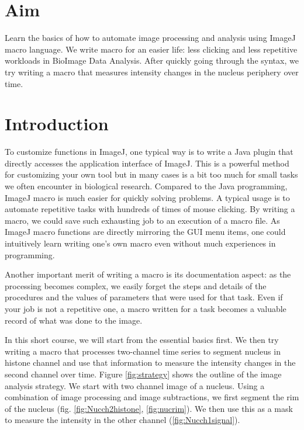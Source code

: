 \section{Aim}

Learn the basics of how to automate image processing and analysis using ImageJ macro language. We write macro for an easier life: less clicking and less repetitive workloads in BioImage Data Analysis. After quickly going through the syntax, we try writing a macro that measures intensity changes in the nucleus periphery over time. 

\section{Introduction}

To customize functions in ImageJ, one typical way is to write a Java plugin that directly accesses the application interface of ImageJ. This is a powerful method for customizing your own tool but in many cases is a bit too much for small tasks we often encounter in biological research. Compared to the Java programming, ImageJ macro is much easier for quickly solving problems. A typical usage is to automate repetitive tasks with hundreds of times of mouse clicking. By writing a macro, we could save such exhausting job to an execution of a macro file. As ImageJ macro functions are directly mirroring the GUI menu items, one could intuitively learn writing one's own macro even without much experiences in programming. 

Another important merit of writing a macro is its documentation aspect: as the processing becomes complex, we easily forget the steps and details of the procedures and the values of parameters that were used for that task. Even if your job is not a repetitive one, a macro written for a task becomes a valuable record of what was done to the image.  

In this short course, we will start from the essential basics first. We then try writing a macro that processes two-channel time series to segment nucleus in histone channel and use that information to measure the intensity changes in the second channel over time. Figure \ref{fig:strategy} shows the outline of the image analysis strategy. We start with two channel image of a nucleus. Using a combination of image processing and image subtractions, we first segment the rim of the nucleus (fig. \ref{fig:Nucch2histone}, \ref{fig:nucrim}). We then use this as a mask to measure the intensity in the other channel (\ref{fig:Nucch1signal}).

